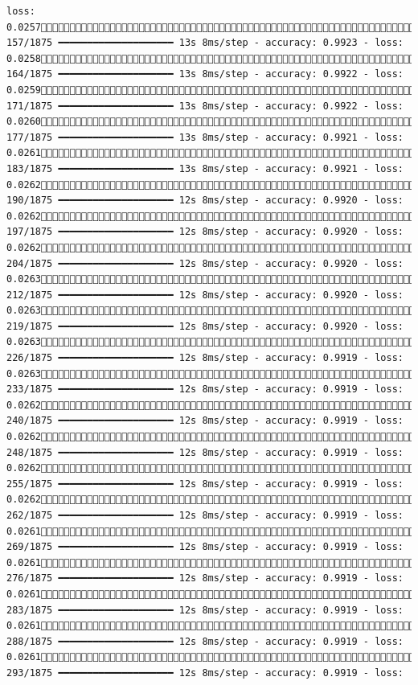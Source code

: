 \documentclass[
  letterpaper,
  DIV=11,
  numbers=noendperiod]{scrreprt}
\begin{document}
\begin{verbatim}
loss: 0.0257 157/1875 ━━━━━━━━━━━━━━━━━━━━ 13s 8ms/step - accuracy: 0.9923 - loss: 0.0258 164/1875 ━━━━━━━━━━━━━━━━━━━━ 13s 8ms/step - accuracy: 0.9922 - loss: 0.0259 171/1875 ━━━━━━━━━━━━━━━━━━━━ 13s 8ms/step - accuracy: 0.9922 - loss: 0.0260 177/1875 ━━━━━━━━━━━━━━━━━━━━ 13s 8ms/step - accuracy: 0.9921 - loss: 0.0261 183/1875 ━━━━━━━━━━━━━━━━━━━━ 13s 8ms/step - accuracy: 0.9921 - loss: 0.0262 190/1875 ━━━━━━━━━━━━━━━━━━━━ 12s 8ms/step - accuracy: 0.9920 - loss: 0.0262 197/1875 ━━━━━━━━━━━━━━━━━━━━ 12s 8ms/step - accuracy: 0.9920 - loss: 0.0262 204/1875 ━━━━━━━━━━━━━━━━━━━━ 12s 8ms/step - accuracy: 0.9920 - loss: 0.0263 212/1875 ━━━━━━━━━━━━━━━━━━━━ 12s 8ms/step - accuracy: 0.9920 - loss: 0.0263 219/1875 ━━━━━━━━━━━━━━━━━━━━ 12s 8ms/step - accuracy: 0.9920 - loss: 0.0263 226/1875 ━━━━━━━━━━━━━━━━━━━━ 12s 8ms/step - accuracy: 0.9919 - loss: 0.0263 233/1875 ━━━━━━━━━━━━━━━━━━━━ 12s 8ms/step - accuracy: 0.9919 - loss: 0.0262 240/1875 ━━━━━━━━━━━━━━━━━━━━ 12s 8ms/step - accuracy: 0.9919 - loss: 0.0262 248/1875 ━━━━━━━━━━━━━━━━━━━━ 12s 8ms/step - accuracy: 0.9919 - loss: 0.0262 255/1875 ━━━━━━━━━━━━━━━━━━━━ 12s 8ms/step - accuracy: 0.9919 - loss: 0.0262 262/1875 ━━━━━━━━━━━━━━━━━━━━ 12s 8ms/step - accuracy: 0.9919 - loss: 0.0261 269/1875 ━━━━━━━━━━━━━━━━━━━━ 12s 8ms/step - accuracy: 0.9919 - loss: 0.0261 276/1875 ━━━━━━━━━━━━━━━━━━━━ 12s 8ms/step - accuracy: 0.9919 - loss: 0.0261 283/1875 ━━━━━━━━━━━━━━━━━━━━ 12s 8ms/step - accuracy: 0.9919 - loss: 0.0261 288/1875 ━━━━━━━━━━━━━━━━━━━━ 12s 8ms/step - accuracy: 0.9919 - loss: 0.0261 293/1875 ━━━━━━━━━━━━━━━━━━━━ 12s 8ms/step - accuracy: 0.9919 - loss: 
\end{verbatim}
\end{document}

